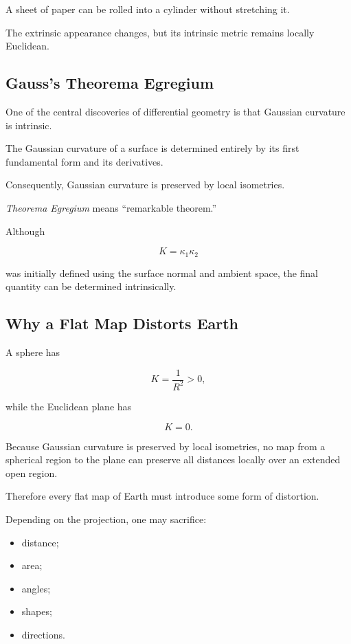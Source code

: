 A sheet of paper can be rolled into a cylinder without stretching it.

The extrinsic appearance changes, but its intrinsic metric remains locally
Euclidean.

\subsection{Gauss's Theorema Egregium}
\label{subsec:theorema-egregium}

One of the central discoveries of differential geometry is that Gaussian
curvature is intrinsic.

\begin{theorem}
The Gaussian curvature of a surface is determined entirely by its first
fundamental form and its derivatives.

Consequently, Gaussian curvature is preserved by local isometries.
\end{theorem}

\emph{Theorema Egregium} means ``remarkable theorem.''

Although

\[
K=\kappa_1\kappa_2
\]

was initially defined using the surface normal and ambient space, the final
quantity can be determined intrinsically.

\subsection{Why a Flat Map Distorts Earth}
\label{subsec:flat-map-distortion}

A sphere has

\[
K=\frac{1}{R^2}>0,
\]

while the Euclidean plane has

\[
K=0.
\]

Because Gaussian curvature is preserved by local isometries, no map from a
spherical region to the plane can preserve all distances locally over an
extended open region.

Therefore every flat map of Earth must introduce some form of distortion.

Depending on the projection, one may sacrifice:

\begin{itemize}
    \item distance;
    \item area;
    \item angles;
    \item shapes;
    \item directions.
\end{itemize}

